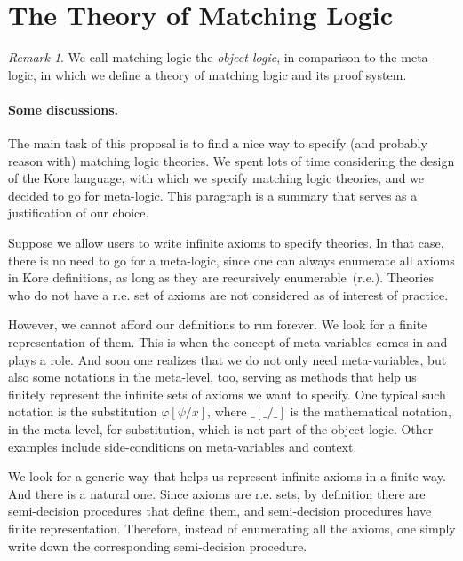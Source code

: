 \documentclass[UTF8]{article}
\newcounter{thmcounter}
\theoremstyle{plain}
\theoremstyle{definition}
\theoremstyle{remark}
\newtheorem{remark}[thmcounter]{Remark}
\begin{document}


\section{The Theory of Matching Logic}

\begin{remark}
	We call matching logic the \emph{object-logic}, in comparison to the meta-logic, in which we define a theory of matching logic and its proof system. 
\end{remark}

\paragraph{Some discussions.}
The main task of this proposal is to find a nice way to specify (and probably reason with) matching logic theories. We spent lots of time considering the design of the Kore language, with which we specify matching logic theories, and we decided to go for meta-logic. This paragraph is a summary that serves as a justification of our choice. 

Suppose we allow users to write infinite axioms to specify theories. In that case, there is no need to go for a meta-logic, since one can always enumerate all axioms in Kore definitions, as long as they are recursively enumerable~(r.e.). Theories who do not have a r.e. set of axioms are not considered as of interest of practice. 

However, we cannot afford our definitions to run forever. We look for a finite representation of them. This is when the concept of meta-variables comes in and plays a role. And soon one realizes that we do not only need meta-variables, but also some notations in the meta-level, too, serving as methods that help us finitely represent the infinite sets of axioms we want to specify. One typical such notation is the substitution $\varphi[\psi/x]$, where $\_[\_/\_]$ is the mathematical notation, in the meta-level, for substitution, which is not part of the object-logic. Other examples include side-conditions on meta-variables and context.

We look for a generic way that helps us represent infinite axioms in a finite way. And there is a natural one. Since axioms are r.e. sets, by definition there are semi-decision procedures that define them, and semi-decision procedures have finite representation. Therefore, instead of enumerating all the axioms, one simply write down the corresponding semi-decision procedure. 
\end{document}
